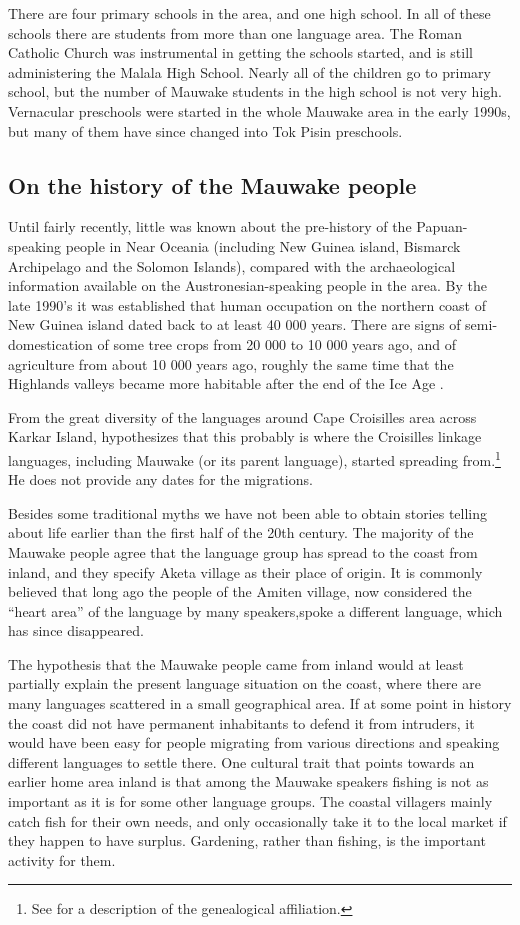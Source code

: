 There are four primary schools in the area, and one high school.  In all of these schools there are students from more than one language area. The Roman Catholic Church was instrumental in getting the schools started, and is still administering the Malala High School.  Nearly all of the children go to primary school, but the number of Mauwake students in the high school is not very high. Vernacular preschools were started in the whole Mauwake area in the early 1990s, but many of them have since changed into Tok Pisin preschools.

\subsection{On the history of the Mauwake people}
Until fairly recently, little was known about the pre-history of the Papuan-speaking people in Near Oceania (including New Guinea island, Bismarck Archipelago and the Solomon Islands), compared with the archaeological information available on the Austronesian-speaking people in the area. By the late 1990's it was established that human occupation on the northern coast of New Guinea island dated back to at least 40 000 years. There are signs of semi-domestication of some tree crops from 20 000 to 10 000 years ago, and of agriculture from about 10 000 years ago, roughly the same time that the Highlands valleys became more habitable after the end of the Ice Age \citep[xi-xvii]{Pawley2005a}. 

From the great diversity of the languages around Cape Croisilles area across Karkar Island, \citet[27]{Ross1996} hypothesizes that this probably is where the Croisilles linkage languages, including Mauwake (or its parent language), started spreading from.\footnote{See  for a description of the genealogical affiliation. }  He does not provide any dates for the migrations.


Besides some traditional myths we have not been able to obtain stories telling about life earlier than the first half of the 20th century.  The majority of the Mauwake people agree that the language group has spread to the coast from inland, and they specify Aketa village as their place of origin. It is commonly believed that long ago the people of the Amiten village, now considered the ``heart area'' of the language by many speakers,spoke a different language, which has since disappeared. 

The hypothesis that the Mauwake people came from inland would at least partially explain the present language situation on the coast, where there are many languages scattered in a small geographical area. If at some point in history the coast did not have permanent inhabitants to defend it from intruders, it would have been easy for people migrating from various directions and speaking different languages to settle there. One cultural trait that points towards an earlier home area inland is that among the Mauwake speakers fishing is not as important as it is for some other language groups. The coastal villagers mainly catch fish for their own needs, and only occasionally take it to the local market if they happen to have surplus. Gardening, rather than fishing, is the important activity for them.


